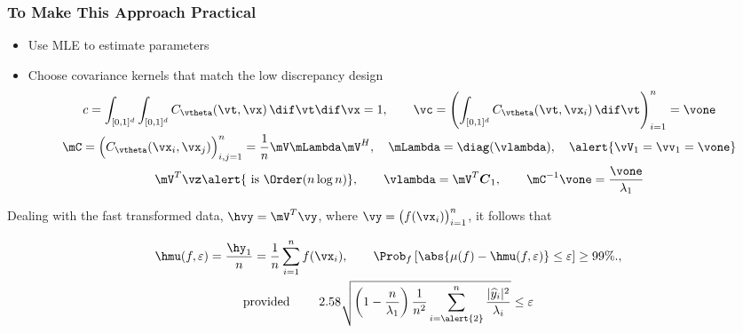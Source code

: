 \documentclass[10pt,compress,xcolor={usenames,dvipsnames},aspectratio=169]{beamer} %
\newcommand{\vC}{\boldsymbol{C}}
\begin{document}
\begin{frame}
\frametitle{To Make This Approach Practical}
\vspace{-4ex}
\begin{itemize}
	\item Use MLE to estimate parameters
	
	\item Choose covariance kernels that \alert{match the low discrepancy design}
	\begin{gather*}
	c = \int_{[0,1]^d} \int_{[0,1]^d} C_{\vtheta}(\vt,\vx) \, \dif \vt \dif \vx = 1, \qquad \vc = \left(\int_{[0,1]^d}  C_{\vtheta}(\vt,\vx_i) \, \dif \vt  \right)_{i=1}^n = \vone \\
	 \mC = \Bigl( C_{\vtheta}(\vx_i, \vx_j) \Bigr)_{i,j=1}^n = \frac 1n \mV \mLambda \mV^H, 
	\quad \mLambda = \diag(\vlambda), \quad \alert{\vV_1 = \vv_1 = \vone} \\
	\mV^T \vz \alert{\text{ is }\Order(n \log n)}, \qquad \vlambda = \mV^T \vC_1, \qquad \mC^{-1} \vone = \frac{\vone}{\lambda_1}
	\end{gather*} 	
	
\end{itemize}

\vspace{-3ex}

Dealing with the \alert{fast transformed} data, $\hvy = \mV^T \vy$, where $\vy = \bigl ( f(\vx_i) \bigr)_{i=1}^n$, it follows that 

\vspace{-5ex}

\begin{gather*}
\hmu(f,\varepsilon) =  \frac{\hy_1}{n} = \frac 1n \sum_{i=1}^n f(\vx_i), \qquad  
\Prob_{f} \left[\abs{ \mu(f) - \hmu(f,\varepsilon) } \le \varepsilon \right] \ge 99\%., \\
\text{provided } \qquad 
2.58\sqrt{\left(1 - \frac{n}{\lambda_1}\right)
	\frac 1{n^2} \sum_{i=\alert{2}}^n \frac{\lvert \widehat{y}_i \rvert^2}{\lambda_i} } \le \varepsilon
\end{gather*}


\end{frame}
\end{document}
